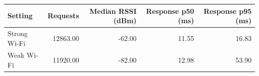 \begin{tabular}{lrrrr}
\toprule
Setting & Requests & Median RSSI (dBm) & Response p50 (ms) & Response p95 (ms) \\
\midrule
Strong Wi-Fi & 12863.00 & -62.00 & 11.55 & 16.83 \\
Weak Wi-Fi & 11920.00 & -82.00 & 12.98 & 53.90 \\
\bottomrule
\end{tabular}
